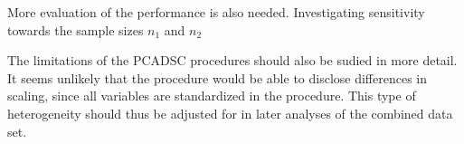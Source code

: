 \documentclass[titlepage,11pt,twoside]{article}
\begin{document}
More evaluation of the performance is also needed. Investigating sensitivity towards the sample sizes $n_1$ and $n_2$ 

The limitations of the PCADSC procedures should also be sudied in more detail. It seems unlikely that the procedure would be able to disclose differences in scaling, since all variables are standardized in the procedure. This type of heterogeneity should thus be adjusted for in later analyses of the combined data set.



\vspace{\fill}\clearpage
\newpage


\end{document}
